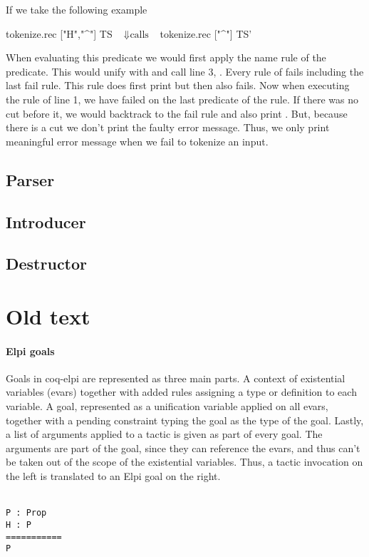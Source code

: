 \documentclass[thesis.tex]{subfiles}
\begin{document}
{{{If we take the following example
\begin{elpicode}
  tokenize.rec ["H","^"] TS
              ~$\Downarrow \text{calls}$~ 
  tokenize.rec ["^"] TS'
\end{elpicode}
When evaluating this predicate we would first apply the name rule of the  predicate. This would unify  with \elpiinline{[tName "H" | TS']} and call line 3, . Every rule of  fails including the last fail rule. This rule does first print  but then also fails. Now when executing the rule of line 1, we have failed on the last predicate of the rule. If there was no cut before it, we would backtrack to the fail rule and also print . But, because there is a cut we don't print the faulty error message. Thus, we only print meaningful error message when we fail to tokenize an input.

\subsection{Parser}\label{ssec:parser}


\subsection{Introducer}\label{ssec:introducer}

\subsection{Destructor}\label{ssec:destructor}

\section{Old text}

\paragraph*{Elpi goals}
Goals in coq-elpi are represented as three main parts. A context of existential variables (evars) together with added rules assigning a type or definition to each variable. A goal, represented as a unification variable applied on all evars, together with a pending constraint typing the goal as the type of the goal. Lastly, a list of arguments applied to a tactic is given as part of every goal. The arguments are part of the goal, since they can reference the evars, and thus can't be taken out of the scope of the existential variables. Thus, a tactic invocation on the left is translated to an Elpi goal on the right.
\\\\
\begin{minipage}[t]{0.2\linewidth}
  \begin{verbatim}
P : Prop
H : P
===========
P


\end{verbatim}
\end{minipage}}}}
\end{document}
